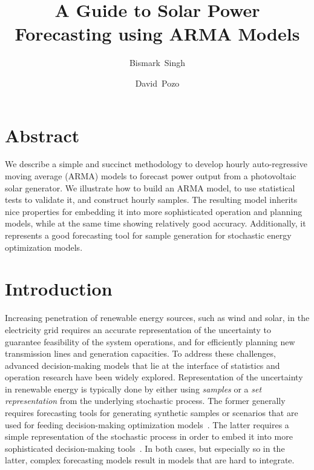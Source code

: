 \documentclass[11pt]{article} %
\author[1]{Bismark~Singh}
\author[2]{David~Pozo}
\affil[1]{Discrete Mathematics \& Optimization, Sandia National Laboratories, Albuquerque, NM 87185, USA}
\affil[2]{Center for Energy Systems, Skolkovo Institute of 
Science and Technology, Moscow, Russia}
\title{A Guide to Solar Power Forecasting using ARMA Models}
\begin{document}
%


%
%
% 



\maketitle

\section*{Abstract}
	We describe a simple and succinct methodology to develop hourly auto-regressive 
	moving average (ARMA) models to forecast power output from a photovoltaic solar generator. 
	We illustrate how to build an ARMA model, to use  statistical tests to validate it, and construct hourly samples. 
	The resulting model inherits nice properties for embedding it into more sophisticated operation and planning models, while at the same time showing relatively good accuracy. Additionally, it represents a good forecasting tool for sample generation for stochastic energy optimization models.







\section{Introduction}
Increasing penetration of renewable energy sources, such as wind and solar, in 
the electricity grid requires an accurate representation of the 
uncertainty to guarantee feasibility of the system operations, and 
for efficiently planning new transmission lines and generation capacities. To 
address these challenges, advanced decision-making models that lie at the
interface of statistics and operation research have been widely 
explored.  Representation of the  uncertainty in renewable energy is typically  
done by either using \textit{samples} or a  \textit{set representation} from the 
underlying stochastic process. The former generally requires forecasting tools 
for generating synthetic samples or scenarios that are used for feeding 
decision-making optimization models~\cite{kleywegt2002sample}. The latter 
requires a simple representation of the stochastic process in 
order to embed it into more sophisticated decision-making 
tools~\cite{lorca2015adaptive}. In both cases, but especially so in the latter, 
complex forecasting models result in models that are hard to integrate. 
\end{document}
